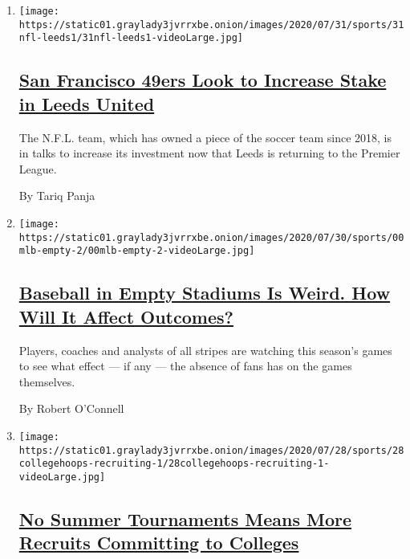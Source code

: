 \begin{enumerate}
\def\labelenumi{\arabic{enumi}.}
\item
  \texttt{[image: https://static01.graylady3jvrrxbe.onion/images/2020/07/31/sports/31nfl-leeds1/31nfl-leeds1-videoLarge.jpg]}

  \hypertarget{san-francisco-49ers-look-to-increase-stake-in-leeds-united}{%
  \subsection{\texorpdfstring{\href{/2020/07/31/sports/soccer/leeds-united-san-francisco-49ers.html}{San
  Francisco 49ers Look to Increase Stake in Leeds
  United}}{San Francisco 49ers Look to Increase Stake in Leeds United}}\label{san-francisco-49ers-look-to-increase-stake-in-leeds-united}}

  The N.F.L. team, which has owned a piece of the soccer team since
  2018, is in talks to increase its investment now that Leeds is
  returning to the Premier League.

  By Tariq Panja
\item
  \texttt{[image: https://static01.graylady3jvrrxbe.onion/images/2020/07/30/sports/00mlb-empty-2/00mlb-empty-2-videoLarge.jpg]}

  \hypertarget{baseball-in-empty-stadiums-is-weird-how-will-it-affect-outcomes}{%
  \subsection{\texorpdfstring{\href{/2020/07/31/sports/baseball/baseball-empty-stadiums-effects.html}{Baseball
  in Empty Stadiums Is Weird. How Will It Affect
  Outcomes?}}{Baseball in Empty Stadiums Is Weird. How Will It Affect Outcomes?}}\label{baseball-in-empty-stadiums-is-weird-how-will-it-affect-outcomes}}

  Players, coaches and analysts of all stripes are watching this
  season's games to see what effect --- if any --- the absence of fans
  has on the games themselves.

  By Robert O'Connell
\item
  \texttt{[image: https://static01.graylady3jvrrxbe.onion/images/2020/07/28/sports/28collegehoops-recruiting-1/28collegehoops-recruiting-1-videoLarge.jpg]}

  \hypertarget{no-summer-tournaments-means-more-recruits-committing-to-colleges}{%
  \subsection{\texorpdfstring{\href{/2020/07/30/sports/ncaabasketball/college-basketball-recruiting.html}{No
  Summer Tournaments Means More Recruits Committing to
  Colleges}}{No Summer Tournaments Means More Recruits Committing to Colleges}}\label{no-summer-tournaments-means-more-recruits-committing-to-colleges}}


\end{enumerate}
